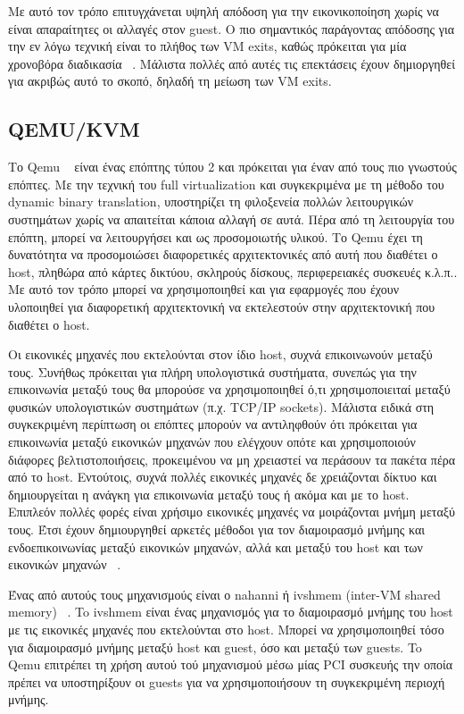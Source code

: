 Με αυτό τον τρόπο επιτυγχάνεται υψηλή απόδοση για την εικονικοποίηση χωρίς να
είναι απαραίτητες οι αλλαγές στον guest. O πιο σημαντικός παράγοντας απόδοσης
για την εν λόγω τεχνική είναι το πλήθος των VM exits, καθώς πρόκειται για μία
χρονοβόρα διαδικασία ~\cite{agesen2012software}. Μάλιστα πολλές από αυτές τις
επεκτάσεις έχουν δημιοργηθεί για  ακριβώς αυτό το σκοπό, δηλαδή τη μείωση των VM
exits. 


\subsection{QEMU/KVM}

Το Qemu ~\cite{bellard2005qemu} είναι ένας επόπτης τύπου 2 και πρόκειται για
έναν από τους πιο γνωστούς επόπτες. Με την τεχνική του full virtualization και
συγκεκριμένα με τη μέθοδο του dynamic binary translation, υποστηρίζει τη
φιλοξενεία πολλών λειτουργικών συστημάτων χωρίς να απαιτείται κάποια αλλαγή σε
αυτά. Πέρα από τη λειτουργία του επόπτη, μπορεί να λειτουργήσει και ως
προσομοιωτής υλικού. Το Qemu έχει τη δυνατότητα να προσομοιώσει διαφορετικές
αρχιτεκτονικές από αυτή που διαθέτει ο host, πληθώρα από κάρτες δικτύου,
σκληρούς δίσκους, περιφερειακές συσκευές κ.λ.π.. Mε αυτό τον τρόπο μπορεί να
χρησιμοποιηθεί και για εφαρμογές που έχουν υλοποιηθεί για διαφορετική
αρχιτεκτονική να εκτελεστούν στην αρχιτεκτονική που διαθέτει ο host. 

Οι εικονικές μηχανές που εκτελούνται στον ίδιο host, συχνά επικοινωνούν μεταξύ
τους. Συνήθως πρόκειται για πλήρη υπολογιστικά συστήματα, συνεπώς για την
επικοινωνία μεταξύ τους θα μπορούσε να χρησιμοποιηθεί ό,τι χρησιμοποιειταί
μεταξύ φυσικών υπολογιστικών συστημάτων (π.χ. TCP/IP sockets). Μάλιστα ειδικά
στη συγκεκριμένη περίπτωση οι επόπτες μπορούν να αντιληφθούν ότι πρόκειται για
επικοινωνία μεταξύ εικονικών μηχανών που ελέγχουν οπότε και χρησιμοποιούν
διάφορες βελτιστοποιήσεις, προκειμένου να μη χρειαστεί να περάσουν τα πακέτα
πέρα από το host. Εντούτοις, συχνά πολλές εικονικές μηχανές δε χρειάζονται
δίκτυο και δημιουργείται η ανάγκη για επικοινωνία μεταξύ τους 
ή ακόμα και με το host. Επιπλεόν πολλές φορές είναι χρήσιμο εικονικές μηχανές
να μοιράζονται μνήμη μεταξύ τους. Έτσι έχουν δημιουργηθεί αρκετές μέθοδοι για
τον διαμοιρασμό μνήμης και ενδοεπικοινωνίας μεταξύ εικονικών μηχανών, αλλά και
μεταξύ του host και των εικονικών μηχανών ~\cite{ren2016shared}. 

Ένας από αυτούς τους μηχανισμούς είναι ο nahanni ή ivshmem (inter-VM shared
memory) ~\cite{macdonell2011shared}. To ivshmem είναι ένας μηχανισμός για το
διαμοιρασμό μνήμης του host με τις εικονικές μηχανές που εκτελούνται στο host.
Μπορεί να χρησιμοποιηθεί τόσο για διαμοιρασμό μνήμης μεταξύ host και guest, όσο
και μεταξύ των guests. To Qemu επιτρέπει τη χρήση αυτού τού μηχανισμού μέσω
μίας PCI συσκευής την οποία πρέπει να υποστηρίξουν οι guests για να
χρησιμοποιήσουν τη συγκεκριμένη περιοχή μνήμης. 


